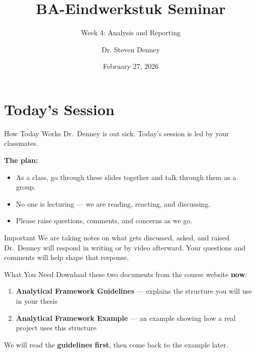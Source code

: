 \documentclass[aspectratio=169,11pt]{beamer}
\title{BA-Eindwerkstuk Seminar}
\subtitle{Week 4: Analysis and Reporting}
\author{Dr. Steven Denney}
\institute{Korean Studies \\ Leiden University}
\date{February 27, 2026}
\begin{document}
\begin{frame}
    \titlepage
\end{frame}

\section{Today's Session}

\begin{frame}{How Today Works}
    Dr.\ Denney is out sick. Today's session is led by your classmates.
    \vspace{0.5cm}

    \textbf{The plan:}
    \begin{itemize}
        \item As a class, go through these slides together and talk through them as a group.
        \item No one is lecturing --- we are reading, reacting, and discussing.
        \item Please raise questions, comments, and concerns as we go.
    \end{itemize}
    \vspace{0.3cm}
    \begin{alertblock}{Important}
        We are taking notes on what gets discussed, asked, and raised. Dr.\ Denney will respond in writing or by video afterward. Your questions and comments will help shape that response.
    \end{alertblock}
\end{frame}

\begin{frame}{What You Need}
    Download these two documents from the course website \textbf{now}:
    \vspace{0.5cm}
    \begin{enumerate}
        \item \textbf{Analytical Framework Guidelines} --- explains the structure you will use in your thesis
        \vspace{0.3cm}
        \item \textbf{Analytical Framework Example} --- an example showing how a real project uses this structure
    \end{enumerate}
    \vspace{0.5cm}
    We will read the \textbf{guidelines first}, then come back to the example later.
\end{frame}
\end{document}

